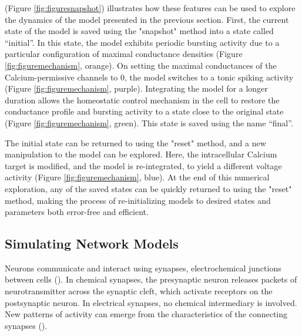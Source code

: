 \documentclass{frontiersSCNS} %
\begin{document}
(Figure \ref{fig:figuresnapshot}) illustrates how these features can be used to explore the dynamics of the model presented in the previous section. First, the current state of the model is saved using the "snapshot" method into a state called ``initial''. In this state, the model exhibits periodic bursting activity due to a particular configuration of maximal conductance densities (Figure \ref{fig:figuremechanism}, orange).  On setting the maximal conductances of the Calcium-permissive channels to 0, the model switches to a tonic spiking activity (Figure \ref{fig:figuremechanism}, purple). Integrating the model for a longer duration allows the homeostatic control mechanism in the cell to restore the conductance profile and bursting activity to a state close to the original state (Figure \ref{fig:figuremechanism}, green). This state is saved using the name ``final''.

The initial state can be returned to using the "reset" method, and a new manipulation to the model can be explored. Here, the intracellular Calcium target is modified, and the model is re-integrated, to yield a different voltage activity (Figure \ref{fig:figuremechanism}, blue). At the end of this numerical exploration, any of the saved states can be quickly returned to using the "reset" method, making the process of re-initializing models to desired states and parameters both error-free and efficient.




%
%
%
%
%
%



\subsection{Simulating Network Models}

Neurons communicate and interact using synapses, electrochemical junctions between cells (\cite{gjorgjievaComputationalImplicationsBiophysical2016, huaNeuralActivityDynamics2004}). In chemical synapses, the presynaptic neuron releases packets of neurotransmitter across the synaptic cleft, which activate receptors on the postsynaptic neuron. In electrical synapses, no chemical intermediary is involved. New patterns of activity can emerge from the characteristics of the connecting synapses (\cite{liComodulationSynapsesVoltagegated2018, nadimSynapticDepressionCreates1999, gutierrezRectifyingElectricalSynapses2013, gutierrezMultipleMechanismsSwitch2013}). 
\end{document}
